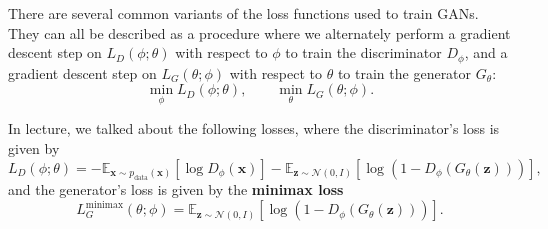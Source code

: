 \documentclass{article}
\newcommand{\bx}{{\boldsymbol{x}}}
\newcommand{\bz}{{\boldsymbol{z}}}
\begin{document}
There are several common variants of the loss functions used to train GANs. They can all be described as a procedure where we alternately perform a gradient descent step on $L_D(\phi;\theta)$ with respect to $\phi$ to train the discriminator $D_\phi$, and a gradient descent step on $L_G(\theta; \phi)$ with respect to $\theta$ to train the generator $G_\theta$: \[
    \min_\phi L_D(\phi; \theta), \qquad \min_\theta L_G(\theta; \phi).
\]

In lecture, we talked about the following losses, where the discriminator's loss is given by \[
    L_D(\phi; \theta) = -\mathbb{E}_{\bx\sim p_\text{data}(\bx)} [ \log D_\phi(\bx) ] - \mathbb{E}_{\bz \sim \mathcal{N}(0,I)} [\log(1 - D_\phi(G_\theta(\bz)))],
\] and the generator's loss is given by the \textbf{minimax loss}\[
    L_G^{\text{minimax}}(\theta; \phi) = \mathbb{E}_{\bz \sim \mathcal{N}(0,I)}[ \log (1 - D_\phi(G_\theta(\bz))) ].
\]
\end{document}

